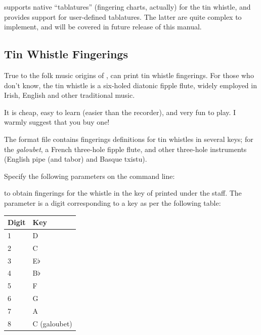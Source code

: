 \documentclass[a4paper,12pt]{book}
\begin{document}
\abcm{} supports native ``tablatures'' (fingering charts, actually)
for the tin whistle, and provides support for user-defined tablatures.
The latter are quite complex to implement, and will be covered in
future release of this manual.


\subsection{Tin Whistle Fingerings}

True to the folk music origins of \ABC, \abcm{} can print tin
whistle fingerings. For those who don't know, the tin whistle is a
six-holed diatonic fipple flute, widely employed in Irish, English and
other traditional music.

\begin{bytheway}

  It is cheap, easy to learn (easier than the recorder), and very fun
  to play. I warmly suggest that you buy one!

\end{bytheway}

The format file  contains fingerings definitions for
tin whistles in several keys; for the \emph{galoubet}, a French
three-hole fipple flute, and other three-hole instruments (English
pipe (and tabor) and Basque txistu).

Specify the following parameters on the \abcm{} command line:

\medskip

   

\medskip

to obtain fingerings for the whistle in the key of  printed
under the staff. The parameter  is a digit corresponding to
a key as per the following table:

\medskip

\begin{center}
  \begin{tabular}{ll}
    \toprule %
    Digit & Key\\
    \midrule %
    1 & D\\
    2 & C\\
    3 & E$\flat$\\
    4 & B$\flat$\\
    5 & F\\
    6 & G\\
    7 & A\\
    8 & C (galoubet)\\
    \bottomrule %
  \end{tabular}
\end{center}
\end{document}
